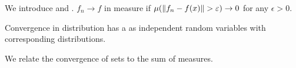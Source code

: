 We introduce  and . \(f_{n} \to f\) in measure if \(\mu\pqty{\norm{f_{n} - f(x)} > \epsilon} \to 0\) for any \(\epsilon > 0\).

Convergence in distribution has a  as independent random variables with corresponding distributions. 

We relate the convergence of sets to the sum  of measures. 
\begin{thm}

\end{thm}
\subsection{}
